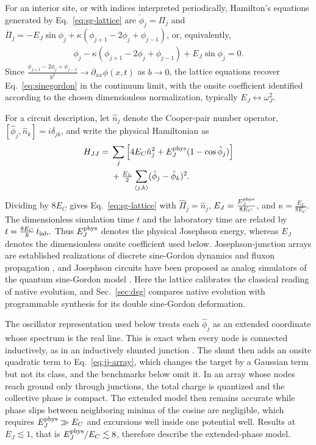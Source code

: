 \documentclass[pra,twocolumn,superscriptaddress,nofootinbib,floatfix]{revtex4-2}
\theoremstyle{remark}
\begin{document}
For an interior site, or with indices interpreted periodically, Hamilton's equations generated by Eq.~\eqref{eq:sg-lattice} are
\(\dot{\phi}_j = \Pi_j\) and \(\dot{\Pi}_j= -E_J\sin\phi_j+ \kappa\left(\phi_{j+1}-2\phi_j+\phi_{j-1}\right)\), or, equivalently,
\begin{align}
\ddot{\phi}_j- \kappa\left(\phi_{j+1}-2\phi_j+\phi_{j-1}\right)+ E_J\sin\phi_j = 0.
\end{align}
Since
$\tfrac{\phi_{j+1}-2\phi_j+\phi_{j-1}}{b^2}\longrightarrow \partial_{xx}\phi(x,t)$
as $b\rightarrow0$, the lattice equations recover Eq.~\eqref{eq:sinegordon} in the continuum limit, with the onsite coefficient identified according to the chosen dimensionless normalization, typically $E_J\leftrightarrow\omega_J^2$.

For a circuit description, let $\hat n_j$ denote the Cooper-pair number operator, $[\hat\phi_j,\hat n_k]=i\delta_{jk}$, and write the physical Hamiltonian as
\begin{align}
H_{JJ}={}&\sum_j\left[4E_C\hat n_j^2+E_J^{\rm phys}(1-\cos\hat\phi_j)\right]\nonumber\\
&+\tfrac{E_L}{2}\sum_{\langle j,k\rangle}(\hat\phi_j-\hat\phi_k)^2.
\label{eq:jj-array}
\end{align}
Dividing by $8E_C$ gives Eq.~\eqref{eq:sg-lattice} with
\(\hat\Pi_j=\hat n_j\), \(E_J=\tfrac{E_J^{\rm phys}}{8E_C}\), and \(\kappa=\tfrac{E_L}{8E_C}\).
The dimensionless simulation time \(t\) and the laboratory time are related by
\(t=\tfrac{8E_C}{\hbar}\,t_{\rm lab}.\)
Thus \(E_J^{\rm phys}\) denotes the physical Josephson energy, whereas \(E_J\) denotes the dimensionless onsite coefficient used below.
Josephson-junction arrays are established realizations of discrete sine-Gordon dynamics and fluxon propagation \cite{Ustinov1995DiscreteSG,Ustinov1998Solitons}, and Josephson circuits have been proposed as analog simulators of the quantum sine-Gordon model \cite{Roy2021}. Here the lattice calibrates the classical reading of native evolution, and Sec.~\ref{sec:dsg} compares native evolution with programmable synthesis for its double sine-Gordon deformation.

The oscillator representation used below treats each \(\hat\phi_j\) as an extended coordinate whose spectrum is the real line. This is exact when every node is connected inductively, as in an inductively shunted junction \cite{Manucharyan2009Fluxonium,Koch2009Rf}. The shunt then adds an onsite quadratic term to Eq.~\eqref{eq:jj-array}, which changes the target by a Gaussian term but not its class, and the benchmarks below omit it. In an array whose nodes reach ground only through junctions, the total charge is quantized and the collective phase is compact. The extended model then remains accurate while phase slips between neighboring minima of the cosine are negligible, which requires \(E_J^{\rm phys}\gg E_C\) and excursions well inside one potential well. Results at \(E_J\lesssim1\), that is \(E_J^{\rm phys}/E_C\lesssim8\), therefore describe the extended-phase model.
\end{document}
